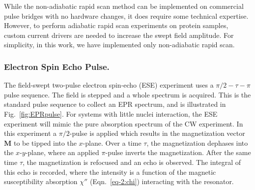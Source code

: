 While the non-adiabatic rapid scan method can be implemented on commercial pulse bridges with no hardware changes, it does require some technical expertise. \cite{MOSER2017} However, to perform adiabatic rapid scan experiments on protein samples, custom current drivers are needed to increase the swept field amplitude. For simplicity, in this work, we have implemented only non-adiabatic rapid scan.

\subsubsection*{Electron Spin Echo Pulse.}
The field-swept two-pulse electron spin-echo (ESE) experiment uses a ${\pi/2\!-\!\tau\!-\!\pi}$ pulse sequence. The field is stepped and a whole spectrum is acquired. This is the standard pulse sequence to collect an EPR spectrum, and is illustrated in Fig.~\ref{fig:EPRpulse}. \cite{schweiger2001principles} For systems with little nuclei interaction, the ESE experiment will mimic the pure absorption spectrum of the CW experiment. In this experiment a $\pi/2$-pulse is applied which results in the magnetization vector $\mathbf{M}$ to be tipped into the $x$-plane. Over a time $\tau$, the magnetization dephases into the $x$-$y$-plane, where an applied $\pi$-pulse inverts the magnetization. After the same time $\tau$, the magnetization is refocused and an echo is observed. The integral of this echo is recorded, where the intensity is a function of the magnetic susceptibility absorption $\chi''$ (Eqn.~\ref{eq-2:chi}) interacting with the resonator.

